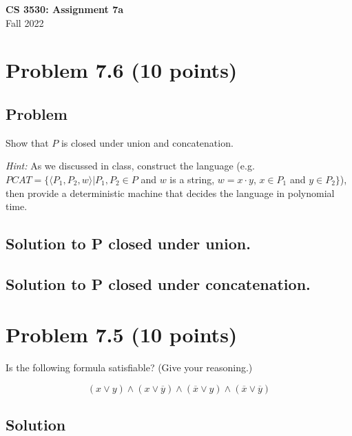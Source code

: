 \documentclass{article}
\begin{document}
\begin{center}
\textbf{\Large CS 3530: Assignment 7a} \\[2mm]
Fall 2022
\end{center}

\raggedright

\section*{Problem 7.6 (10 points)}

\subsection*{Problem}

Show that $P$ is closed under union and concatenation.

\emph{Hint:} As we discussed in class,
construct the language (e.g. $PCAT = \{ \langle P_1,P_2,w \rangle | P_1,P_2 \in P $ and $ w $ is a string,  $ w = x \cdot y $, $ x \in P_1 $ and $ y \in P_2 \}$),
then provide a deterministic machine that decides the language in polynomial time.

\subsection*{Solution to P closed under union.}

\subsection*{Solution to P closed under concatenation.}

\section*{Problem 7.5 (10 points)}

Is the following formula satisfiable?  (Give your reasoning.)

$$(x \lor y) \land (x \lor \overline{y}) \land (\overline{x} \lor y) \land (\overline{x} \lor \overline{y})$$

\subsection*{Solution}
\end{document}
